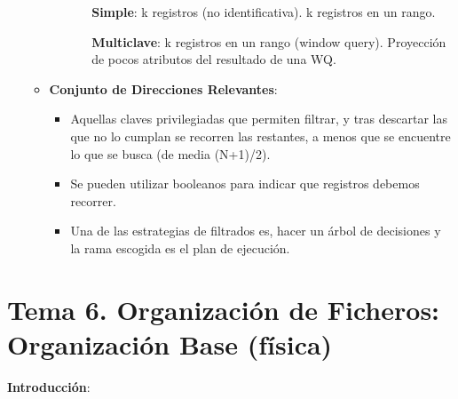\documentclass[12pt, twoside, openright]{report} %
\begin{document}
\begin{itemize}
\begin{itemize}
\begin{itemize}
\begin{itemize}
			
              \textbf{Simple}: k registros (no identificativa). k
              registros en un rango.
             			  
              \textbf{Multiclave}: k registros en un rango (window
              query). Proyección de pocos atributos del resultado de una
              WQ.
            
			  
          \end{itemize}
        \end{itemize}
      \item \textbf{Conjunto de Direcciones Relevantes}:
        

        \begin{itemize}
        \item Aquellas claves privilegiadas que permiten filtrar, y tras
          descartar las que no lo cumplan se recorren las restantes, a
          menos que se encuentre lo que se busca (de media (N+1)/2).
          
        \item Se pueden utilizar booleanos para indicar que registros
          debemos recorrer.
          
        \item Una de las estrategias de filtrados es, hacer un árbol de
          decisiones y la rama escogida es el plan de ejecución.
          
        \end{itemize}
      \end{itemize}
    \end{itemize}

  
\chapter{Tema 6. Organización de Ficheros: Organización Base (física)}



  
  \textbf{Introducción}:
  
\end{document}
